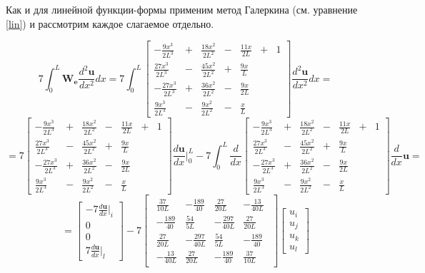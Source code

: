 Как и для линейной функции-формы применим метод Галеркина (см. уравнение \ref{lin}) и рассмотрим каждое слагаемое отдельно.

$$7 \int_0^L \mathbf{W_e} \frac{d^2 \mathbf{u}}{dx^2} dx
=
7\int_0^L
\begin{bmatrix}
	-\frac{9x^3}{2L^3}&+&\frac{18x^2}{2L^2}&-&\frac{11x}{2L} &+& 1\\
	\frac{27x^3}{2L^3}&-&\frac{45x^2}{2L^2}&+&\frac{9x}{L}&&\\
	-\frac{27x^3}{2L^3}&+&\frac{36x^2}{2L^2}&-&\frac{9x}{2L}&&\\
	\frac{9x^3}{2L^3}&-&\frac{9x^2}{2L^2}&-&\frac{x}{L}&&
\end{bmatrix}
\frac{d^2 \mathbf{u}}{dx^2} dx
=
$$
$$
=
7
\begin{bmatrix}
	-\frac{9x^3}{2L^3}&+&\frac{18x^2}{2L^2}&-&\frac{11x}{2L} &+& 1\\
	\frac{27x^3}{2L^3}&-&\frac{45x^2}{2L^2}&+&\frac{9x}{L}&&\\
	-\frac{27x^3}{2L^3}&+&\frac{36x^2}{2L^2}&-&\frac{9x}{2L}&&\\
	\frac{9x^3}{2L^3}&-&\frac{9x^2}{2L^2}&-&\frac{x}{L}&&
\end{bmatrix}
\frac{d\mathbf{u}}{dx} |_0^L
  -7  \int_0^L \frac{d}{dx}
\begin{bmatrix}
	-\frac{9x^3}{2L^3}&+&\frac{18x^2}{2L^2}&-&\frac{11x}{2L} &+& 1\\
	\frac{27x^3}{2L^3}&-&\frac{45x^2}{2L^2}&+&\frac{9x}{L}&&\\
	-\frac{27x^3}{2L^3}&+&\frac{36x^2}{2L^2}&-&\frac{9x}{2L}&&\\
	\frac{9x^3}{2L^3}&-&\frac{9x^2}{2L^2}&-&\frac{x}{L}&&
\end{bmatrix}
\frac{d}{dx} \mathbf{u}
=$$
$$
=
\begin{bmatrix}
	  -7 \frac{d\mathbf{u}}{dx}|_i \\
	0\\
	0\\
7\frac{d\mathbf{u}}{dx}|_l
\end{bmatrix}
  -7 
\begin{bmatrix}
\begin{array}{rrrr}
	\frac{37}{10L} & -\frac{189}{40} & \frac{27}{20L} & -\frac{13}{40L}\\
	-\frac{189}{40} & \frac{54}{5L} & -\frac{297}{40L} & \frac{27}{20L}\\
	\frac{27}{20L} &  -\frac{297}{40L} & \frac{54}{5L} & -\frac{189}{40}\\
	-\frac{13}{40L} & \frac{27}{20L} & -\frac{189}{40} & \frac{37}{10L}
\end{array}
\end{bmatrix}
\begin{bmatrix}
u_i \\
u_j \\
u_k\\
u_l
\end{bmatrix}
$$

